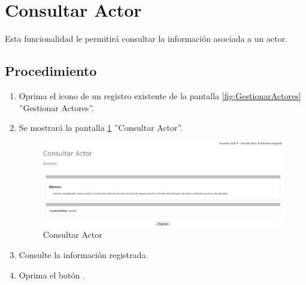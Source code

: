 \hypertarget{cv:consultarActor}{\section{Consultar Actor}} \label{sec:consultarActor}

	Esta funcionalidad le permitirá consultar la información asociada a un actor.

		\subsection{Procedimiento}

			\begin{enumerate}
	
			\item Oprima el icono \IUConsultar{} de un registro existente de la pantalla \ref{fig:GestionarActores} ''Gestionar Actores''.
	
			\item Se mostrará la pantalla \ref{fig:consultarActor} ''Consultar Actor''.
			
			\begin{figure}[htbp!]
				\begin{center}
					\includegraphics[scale=0.5]{roles/lider/actor/pantallas/IU10-4consultarActor}
					\caption{Consultar Actor}
					\label{fig:consultarActor}
				\end{center}
			\end{figure}
						
			\item Consulte la información registrada.
			
			\item Oprima el botón \IURegresar.
		\end{enumerate} 